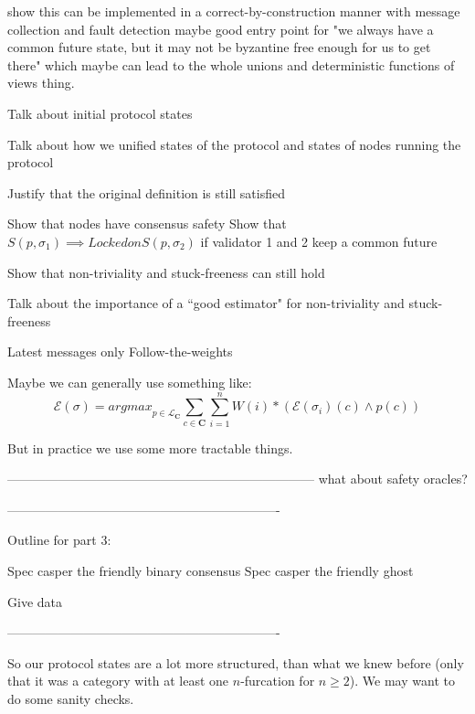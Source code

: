\documentclass{article}
\theoremstyle{definition}
\newcommand{\cat}{
	\mathbf
}
\begin{document}
show this can be implemented in a correct-by-construction manner with message collection and fault detection
maybe good entry point for "we always have a common future state, but it may not be byzantine free enough for us to get there"
which maybe can lead to the whole unions and deterministic functions of views thing.

Talk about initial protocol states

Talk about how we unified states of the protocol and states of nodes running the protocol



Justify that the original definition is still satisfied

Show that nodes have consensus safety
Show that $S(p, \sigma_1) \implies Locked on S(p, \sigma_2)$ if validator 1 and 2 keep a common future

Show that non-triviality and stuck-freeness can still hold

Talk about the importance of a ``good estimator" for non-triviality and stuck-freeness

Latest messages only
Follow-the-weights

Maybe we can generally use something like:
$$
\mathcal{E}(\sigma) = {argmax}_{p\in \mathcal{L}_\cat{C}} \sum_{c \in \cat{C}} \sum_{i=1}^n W(i)*(\mathcal{E}(\sigma_i)(c) \land p(c))
$$ 

But in practice we use some more tractable things.

------------------------------------------------------------------------
what about safety oracles?



----------------------------------------------------------------

Outline for part 3:

Spec casper the friendly binary consensus
Spec casper the friendly ghost

Give data


----------------------------------------------------------------






\iffalse


So our protocol states are a lot more structured, than what we knew before (only that it was a category with at least one $n$-furcation for $n\geq 2$). We may want to do some sanity checks.
\end{document}
